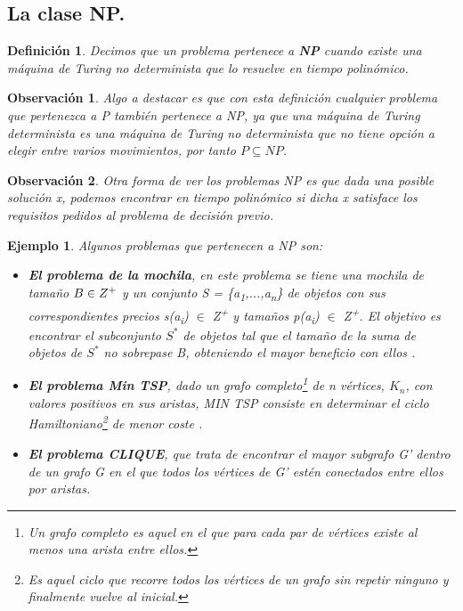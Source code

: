\documentclass[a4paper,12pt,titlepage]{article}
\newtheorem{defi}{Definici\'on}[section]
\newtheorem{eje}{Ejemplo}[section]
\newtheorem{obs}{Observaci\'on}[section]
\begin{document}
\subsection{La clase NP.}

\begin{defi}

Decimos que un problema pertenece a \textbf{NP} cuando existe una m\'aquina de Turing no determinista que lo resuelve en tiempo polin\'omico.

\end{defi}

\begin{obs}

Algo a destacar es que con esta definici\'on  cualquier problema que pertenezca a P tambi\'en pertenece a NP, ya que una m\'aquina de Turing determinista es una m\'aquina de Turing no determinista que no tiene opci\'on a elegir entre varios movimientos, por tanto $P \subseteq NP$.

\end{obs}

\begin{obs}

Otra forma de ver los problemas NP es que dada una posible soluci\'on x, podemos encontrar en tiempo polin\'omico si dicha x satisface los requisitos pedidos al problema de decisi\'on previo.

\end {obs}

\begin{eje}

Algunos problemas que pertenecen a NP son:

\begin{itemize}

  \item \textbf{El problema de la mochila}, en este problema se tiene una mochila de tamaño $B \in Z\textsuperscript{+}$ y un conjunto S = \{a\textsubscript{1},...,a\textsubscript{n}\} de objetos con sus correspondientes precios s(a\textsubscript{i}) $\in$ Z\textsuperscript{+} y tamaños p(a\textsubscript{i}) $\in$ Z\textsuperscript{+}. El objetivo es encontrar el subconjunto $S^{*}$ de objetos tal que el tamaño de la suma de objetos de $S^{*}$ no sobrepase B, obteniendo el mayor beneficio con ellos \cite{knapsack1}.
  \item \textbf{El problema Min TSP}, dado un grafo completo\footnote{Un grafo completo es aquel en el que para cada par de v\'ertices existe al menos una arista entre ellos.} de n v\'ertices, $K_{n}$, con valores positivos en sus aristas, MIN TSP consiste en determinar el ciclo Hamiltoniano\footnote{Es aquel ciclo que recorre todos los v\'ertices de un grafo sin repetir ninguno y finalmente vuelve al inicial.} de menor coste \cite{approx_core}.
  \item \textbf{El problema CLIQUE}, que trata de encontrar el mayor subgrafo G' dentro de un grafo G en el que todos los v\'ertices de G' est\'en conectados entre ellos por aristas.

\end{itemize}

\end{eje}
\end{document}
